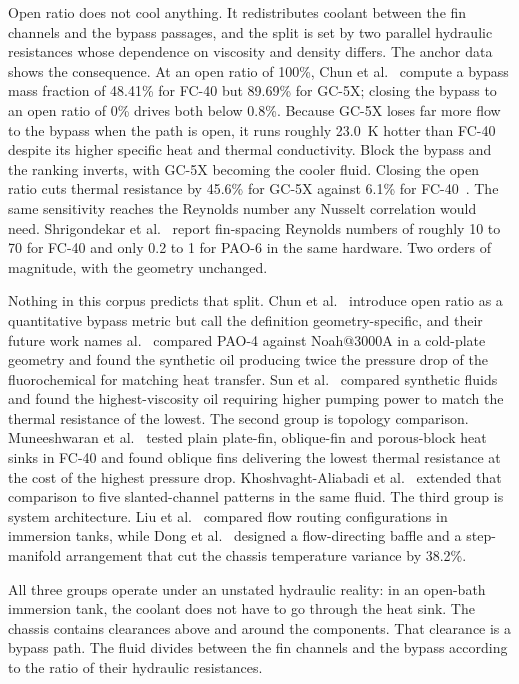 \documentclass[preprint,12pt]{elsarticle}
\begin{document}
Open ratio does not cool anything. It redistributes coolant between the fin channels and the
bypass passages, and the split is set by two parallel hydraulic resistances whose dependence on
viscosity and density differs. The anchor data shows the consequence. At an open ratio of 100\%,
Chun et al.~\cite{chun2026} compute a bypass mass fraction of 48.41\% for FC-40 but 89.69\% for
GC-5X; closing the bypass to an open ratio of 0\% drives both below 0.8\%. Because GC-5X loses far
more flow to the bypass when the path is open, it runs roughly 23.0~K hotter than FC-40 despite
its higher specific heat and thermal conductivity. Block the bypass and the ranking inverts, with
GC-5X becoming the cooler fluid. Closing the open ratio cuts thermal resistance by 45.6\% for
GC-5X against 6.1\% for FC-40~\cite{chun2026}. The same sensitivity reaches the Reynolds number
any Nusselt correlation would need. Shrigondekar et al.~\cite{shrigondekar2023} report fin-spacing
Reynolds numbers of roughly 10 to 70 for FC-40 and only 0.2 to 1 for PAO-6 in the same hardware.
Two orders of magnitude, with the geometry unchanged.

Nothing in this corpus predicts that split. Chun et al.~\cite{chun2026} introduce open ratio as a
quantitative bypass metric but call the definition geometry-specific, and their future work names
al.~\cite{zhang2024pao4} compared PAO-4 against Noah@3000A in a cold-plate geometry and found
the synthetic oil producing twice the pressure drop of the fluorochemical for matching heat
transfer. Sun et al.~\cite{sun2025} compared synthetic fluids and found the
highest-viscosity oil requiring higher pumping power to match the thermal resistance of
the lowest. The second group is topology comparison. Muneeshwaran et al.~\cite{muneeshwaran2023}
tested plain plate-fin, oblique-fin and porous-block heat sinks in FC-40 and found oblique fins
delivering the lowest thermal resistance at the cost of the highest pressure drop.
Khoshvaght-Aliabadi et al.~\cite{khoshvaghtaliabadi2026oblique} extended that comparison to five
slanted-channel patterns in the same fluid. The third group is system architecture. Liu et
al.~\cite{liu2024tank} compared flow routing configurations in immersion tanks, while Dong et al.~\cite{dong2026}
designed a flow-directing baffle and a step-manifold arrangement that cut the chassis temperature
variance by 38.2\%.

All three groups operate under an unstated hydraulic reality: in an open-bath immersion tank,
the coolant does not have to go through the heat sink. The chassis contains clearances above and
around the components. That clearance is a bypass path. The fluid divides between the fin
channels and the bypass according to the ratio of their hydraulic resistances.
\end{document}
